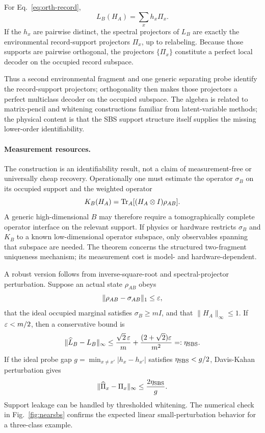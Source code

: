 \begin{proposition}
\label{prop:spectral-anchor}
For Eq.~\eqref{eq:orth-record},
\begin{equation}
L_B(H_A)=\sum_xh_x\Pi_x.
\label{eq:spectral-anchor}
\end{equation}
If the $h_x$ are pairwise distinct, the spectral projectors of $L_B$ are exactly the environmental record-support projectors $\Pi_x$, up to relabeling. Because those supports are pairwise orthogonal, the projectors $\{\Pi_x\}$ constitute a perfect local decoder on the occupied record subspace.
\end{proposition}

Thus a second environmental fragment and one generic separating probe identify the record-support projectors; orthogonality then makes those projectors a perfect multiclass decoder on the occupied subspace.  The algebra is related to matrix-pencil and whitening constructions familiar from latent-variable methods; the physical content is that the SBS support structure itself supplies the missing lower-order identifiability.

\paragraph{Measurement resources.}
The construction is an identifiability result, not a claim of measurement-free or universally cheap recovery.  Operationally one must estimate the operator $\sigma_B$ on its occupied support and the weighted operator
\begin{equation}
K_B(H_A)=\operatorname{Tr}_A[(H_A\otimes I)\rho_{AB}].
\end{equation}
A generic high-dimensional $B$ may therefore require a tomographically complete operator interface on the relevant support.  If physics or hardware restricts $\sigma_B$ and $K_B$ to a known low-dimensional operator subspace, only observables spanning that subspace are needed.  The theorem concerns the structured two-fragment uniqueness mechanism; its measurement cost is model- and hardware-dependent.

A robust version follows from inverse-square-root and spectral-projector perturbation.  Suppose an actual state $\rho_{AB}$ obeys
\begin{equation}
\|\rho_{AB}-\sigma_{AB}\|_1\le\varepsilon,
\end{equation}
that the ideal occupied marginal satisfies $\sigma_B\ge mI$, and that $\|H_A\|_\infty\le1$.  If $\varepsilon<m/2$, then a conservative bound is
\begin{equation}
\|\widehat L_B-L_B\|_\infty
\le
\frac{\sqrt2\,\varepsilon}{m}
+\frac{(2+\sqrt2)\varepsilon}{m^2}
=:\eta_{\rm SBS}.
\label{eq:sbs-perturb}
\end{equation}
If the ideal probe gap $g=\min_{x\neq x'}|h_x-h_{x'}|$ satisfies $\eta_{\rm SBS}<g/2$, Davis-Kahan perturbation gives
\begin{equation}
\|\widehat\Pi_x-\Pi_x\|_\infty
\le\frac{2\eta_{\rm SBS}}{g}.
\label{eq:projector-bound}
\end{equation}
Support leakage can be handled by thresholded whitening.  The numerical check in Fig.~\ref{fig:nearsbs} confirms the expected linear small-perturbation behavior for a three-class example.

